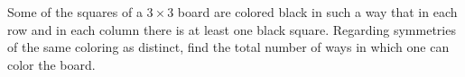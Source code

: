 Some of the squares of a $3 \times 3$ board are colored black in such a way that in each row and in each column there is at least one black square. Regarding symmetries of the same coloring as distinct, find the total number of ways in which one can color the board.
